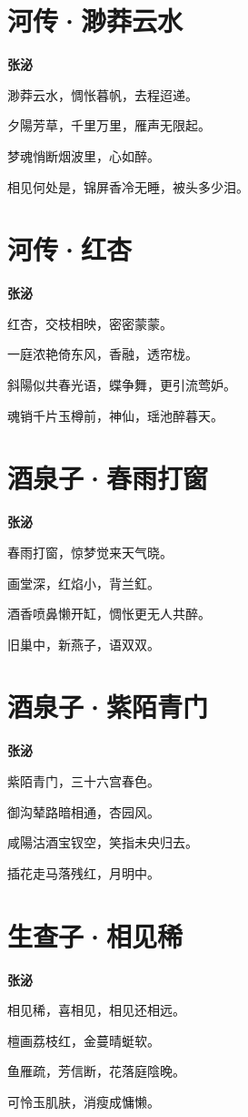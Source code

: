 \documentclass[12pt,a4paper]{ctexbook}
\begin{document}
\section{河传·渺莽云水}
\textbf{张泌}\par\vspace{0.5em}
渺莽云水，惆怅暮帆，去程迢递。\par
夕陽芳草，千里万里，雁声无限起。\par
梦魂悄断烟波里，心如醉。\par
相见何处是，锦屏香冷无睡，被头多少泪。\par

\section{河传·红杏}
\textbf{张泌}\par\vspace{0.5em}
红杏，交枝相映，密密蒙蒙。\par
一庭浓艳倚东风，香融，透帘栊。\par
斜陽似共春光语，蝶争舞，更引流莺妒。\par
魂销千片玉樽前，神仙，瑶池醉暮天。\par

\section{酒泉子·春雨打窗}
\textbf{张泌}\par\vspace{0.5em}
春雨打窗，惊梦觉来天气晓。\par
画堂深，红焰小，背兰釭。\par
酒香喷鼻懒开缸，惆怅更无人共醉。\par
旧巢中，新燕子，语双双。\par

\section{酒泉子·紫陌青门}
\textbf{张泌}\par\vspace{0.5em}
紫陌青门，三十六宫春色。\par
御沟辇路暗相通，杏园风。\par
咸陽沽酒宝钗空，笑指未央归去。\par
插花走马落残红，月明中。\par

\section{生查子·相见稀}
\textbf{张泌}\par\vspace{0.5em}
相见稀，喜相见，相见还相远。\par
檀画荔枝红，金蔓晴蜓软。\par
鱼雁疏，芳信断，花落庭陰晚。\par
可怜玉肌肤，消瘦成慵懒。\par
\end{document}
